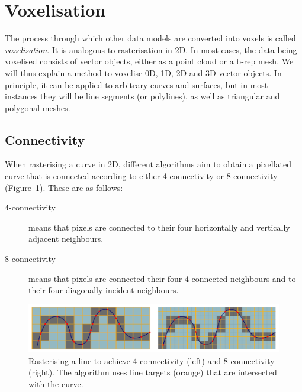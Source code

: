 \section{Voxelisation}

The process through which other data models are converted into voxels is called \emph{voxelisation}.
It is analogous to rasterisation in 2D.
In most cases, the data being voxelised consists of vector objects, either as a point cloud or a b-rep mesh.
We will thus explain a method to voxelise 0D, 1D, 2D and 3D vector objects.
In principle, it can be applied to arbitrary curves and surfaces, but in most instances they will be line segments (or polylines), as well as triangular and polygonal meshes.

\subsection{Connectivity}

When rasterising a curve in 2D, different algorithms aim to obtain a pixellated curve that is connected according to either 4-connectivity or 8-connectivity (Figure~\ref{fig:rasterisation}).
These are as follows:
\begin{description}
\item[4-connectivity] means that pixels are connected to their four horizontally and vertically adjacent neighbours.
\item[8-connectivity] means that pixels are connected their four 4-connected neighbours and to their four diagonally incident neighbours.
\end{description}

\begin{figure}
\centering
\includegraphics[width=\linewidth]{figs/rasterisation}
\caption{Rasterising a line to achieve 4-connectivity (left) and 8-connectivity (right). The algorithm uses line targets (orange) that are intersected with the curve.}%
\label{fig:rasterisation}
\end{figure}

